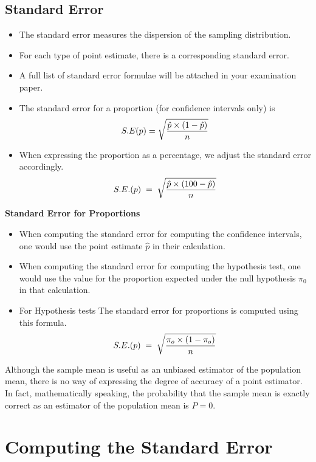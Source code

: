 \documentclass[]{report}
\begin{document}
\subsection{Standard Error}

\begin{itemize}
\item The standard error measures the dispersion of the sampling distribution.
\item For each type of point estimate, there is a corresponding standard error.
\item A full list of standard error formulae will be attached in your examination paper.
\item The standard error for a proportion (for confidence intervals only) is
\[ S.E(p)  = \sqrt{{ \hat{p} \times (1- \hat{p}) \over n}} \]
\item
When expressing the proportion as a percentage, we adjust the standard error accordingly.
\[
S.E. (p) \;=\; \sqrt{ {\hat{p} \times (100 -\hat{p} )\over n}}\]
\end{itemize}

\textbf{Standard Error for Proportions}

\begin{itemize}
\item When computing the standard error for computing the confidence intervals, one would use the point estimate $\hat{p}$ in
their calculation.
\item When computing the standard error for computing the hypothesis test, one would use the value for the proportion expected under the null hypothesis $\pi_0$ in
that calculation.
\item For Hypothesis tests The standard error for proportions is computed using this formula.
\[
S.E. (p) \;=\; \sqrt{ {\pi_o \times (1-\pi_o )\over n}}
\]
\end{itemize}



Although the sample mean is useful as an unbiased estimator of the population mean, there is no way of
expressing the degree of accuracy of a point estimator. In fact, mathematically speaking, the probability that the
sample mean is exactly correct as an estimator of the population mean is $P = 0$.



\section{Computing the Standard Error}
\end{document}
